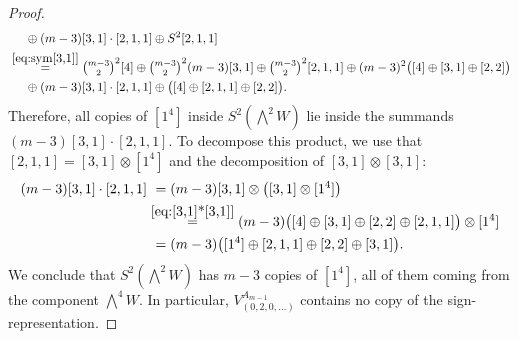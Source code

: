 \documentclass[10pt,a4paper]{amsart}
\begin{document}
\begin{proof}
\begin{align*}
& \ \quad \oplus (m-3)[3,1]\cdot [2,1,1] \oplus S^2[2,1,1] \\
& \stackrel{\eqref{eq:sym[3,1]}}{=} {\textstyle \binom{m-3}{2}^2}[4] \oplus {\textstyle \binom{m-3}{2}^2}(m-3)[3,1] \oplus {\textstyle \binom{m-3}{2}^2}[2,1,1] \oplus (m-3)^2\big( [4] \oplus [3,1] \oplus [2,2] \big) \\
& \ \quad \oplus (m-3)[3,1]\cdot [2,1,1] \oplus \big( [4] \oplus [2,1,1] \oplus [2,2] \big) .
\end{align*}
Therefore, all copies of $[1^4]$ inside $S^2(\bigwedge^2W)$ lie inside the summands $(m-3)[3,1]\cdot [2,1,1]$. To decompose this product, we use that $[2,1,1]=[3,1]\otimes [1^4]$ and the decomposition of $[3,1]\otimes [3,1]$:
\begin{align*}
(m-3)[3,1]\cdot [2,1,1] & \ = (m-3) [3,1] \otimes \big([3,1] \otimes [1^4] \big) \\
& \stackrel{\eqref{eq:[3,1]*[3,1]}}{=} (m-3)\big( [4] \oplus [3,1] \oplus [2,2] \oplus [2,1,1]\big) \otimes [1^4]\\
& \ = (m-3)\big( [1^4] \oplus [2,1,1] \oplus [2,2] \oplus [3,1] \big) .
\end{align*}
We conclude that $S^2(\bigwedge^2W)$ has $m-3$ copies of $[1^4]$, all of them coming from the component $\bigwedge^4W$. In particular, $V_{(0,2,0,\ldots)}^{A_{m-1}}$ contains no copy of the sign-representation.
\end{proof}
\end{document}

